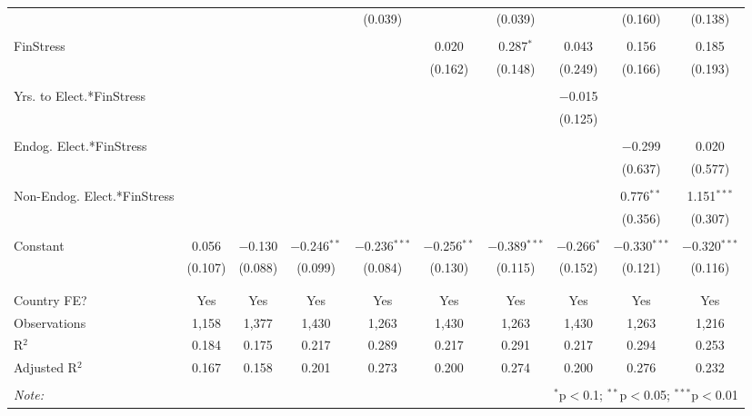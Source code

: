 \begin{table}[!htbp]
\begin{tabular}{@{\extracolsep{5pt}}lccccccccc}
  &  &  &  & (0.039) &  & (0.039) &  & (0.160) & (0.138) \\ 
  & & & & & & & & & \\ 
 FinStress &  &  &  &  & 0.020 & 0.287$^{*}$ & 0.043 & 0.156 & 0.185 \\ 
  &  &  &  &  & (0.162) & (0.148) & (0.249) & (0.166) & (0.193) \\ 
  & & & & & & & & & \\ 
 Yrs. to Elect.*FinStress &  &  &  &  &  &  & $-$0.015 &  &  \\ 
  &  &  &  &  &  &  & (0.125) &  &  \\ 
  & & & & & & & & & \\ 
 Endog. Elect.*FinStress &  &  &  &  &  &  &  & $-$0.299 & 0.020 \\ 
  &  &  &  &  &  &  &  & (0.637) & (0.577) \\ 
  & & & & & & & & & \\ 
 Non-Endog. Elect.*FinStress &  &  &  &  &  &  &  & 0.776$^{**}$ & 1.151$^{***}$ \\ 
  &  &  &  &  &  &  &  & (0.356) & (0.307) \\ 
  & & & & & & & & & \\ 
 Constant & 0.056 & $-$0.130 & $-$0.246$^{**}$ & $-$0.236$^{***}$ & $-$0.256$^{**}$ & $-$0.389$^{***}$ & $-$0.266$^{*}$ & $-$0.330$^{***}$ & $-$0.320$^{***}$ \\ 
  & (0.107) & (0.088) & (0.099) & (0.084) & (0.130) & (0.115) & (0.152) & (0.121) & (0.116) \\ 
  & & & & & & & & & \\ 
\hline \\[-1.8ex] 
Country FE? & Yes & Yes & Yes & Yes & Yes & Yes & Yes & Yes & Yes \\ 
Observations & 1,158 & 1,377 & 1,430 & 1,263 & 1,430 & 1,263 & 1,430 & 1,263 & 1,216 \\ 
R$^{2}$ & 0.184 & 0.175 & 0.217 & 0.289 & 0.217 & 0.291 & 0.217 & 0.294 & 0.253 \\ 
Adjusted R$^{2}$ & 0.167 & 0.158 & 0.201 & 0.273 & 0.200 & 0.274 & 0.200 & 0.276 & 0.232 \\ 
\hline 
\hline \\[-1.8ex] 
\textit{Note:}  & \multicolumn{9}{r}{$^{*}$p$<$0.1; $^{**}$p$<$0.05; $^{***}$p$<$0.01} \\ 
\end{tabular} 
\end{table} 
